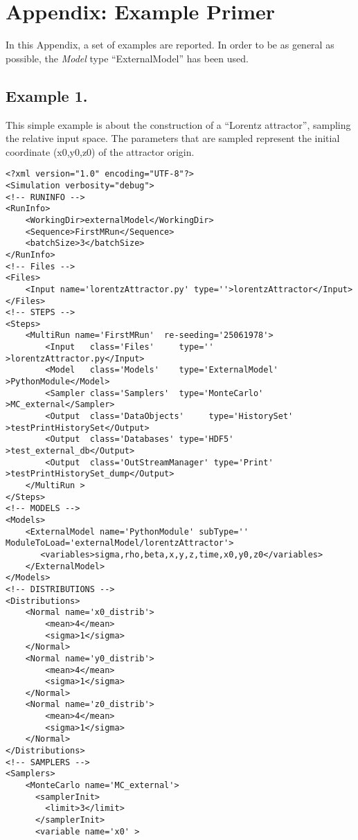 \appendix
\section{Appendix: Example Primer}
\label{sec:examplePrimer}
In this Appendix, a set of examples are reported. In order to be as general as possible, the \textit{Model} type ``ExternalModel'' has been used.
\subsection{Example 1.}
\label{subsec:ex1}
This simple example is about the construction of a ``Lorentz attractor'', sampling the relative input space. The parameters that are sampled represent the initial coordinate (x0,y0,z0) of the attractor origin. 

\begin{lstlisting}[style=XML,morekeywords={debug,re,seeding,class,subType,limit}]
<?xml version="1.0" encoding="UTF-8"?>
<Simulation verbosity="debug">
<!-- RUNINFO -->
<RunInfo>
    <WorkingDir>externalModel</WorkingDir>
    <Sequence>FirstMRun</Sequence>
    <batchSize>3</batchSize>
</RunInfo>
<!-- Files -->
<Files>
    <Input name='lorentzAttractor.py' type=''>lorentzAttractor</Input>
</Files>
<!-- STEPS -->
<Steps>
    <MultiRun name='FirstMRun'  re-seeding='25061978'>
        <Input   class='Files'     type=''               >lorentzAttractor.py</Input>
        <Model   class='Models'    type='ExternalModel'  >PythonModule</Model>
        <Sampler class='Samplers'  type='MonteCarlo'     >MC_external</Sampler>
        <Output  class='DataObjects'     type='HistorySet'      >testPrintHistorySet</Output>
        <Output  class='Databases' type='HDF5'           >test_external_db</Output>
        <Output  class='OutStreamManager' type='Print'   >testPrintHistorySet_dump</Output>
    </MultiRun >
</Steps>
<!-- MODELS -->
<Models>
    <ExternalModel name='PythonModule' subType='' ModuleToLoad='externalModel/lorentzAttractor'>  
       <variables>sigma,rho,beta,x,y,z,time,x0,y0,z0</variables>
    </ExternalModel>
</Models>
<!-- DISTRIBUTIONS -->
<Distributions>
    <Normal name='x0_distrib'>
        <mean>4</mean>
        <sigma>1</sigma>
    </Normal>
    <Normal name='y0_distrib'>
        <mean>4</mean>
        <sigma>1</sigma>
    </Normal>
    <Normal name='z0_distrib'>
        <mean>4</mean>
        <sigma>1</sigma>
    </Normal>
</Distributions>
<!-- SAMPLERS -->
<Samplers>
    <MonteCarlo name='MC_external'>
      <samplerInit>
        <limit>3</limit>
      </samplerInit>
      <variable name='x0' >

\end{lstlisting}
